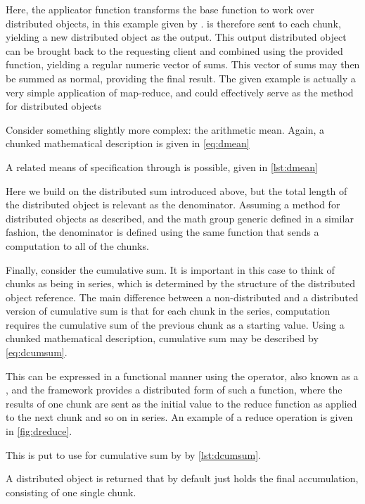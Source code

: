 Here, the  applicator function transforms the base  function to work over distributed objects, in this example given by .
 is therefore sent to each chunk, yielding a new distributed object as the output.
This output distributed object can be brought back to the requesting client and combined using the provided  function, yielding a regular \R{} numeric vector of sums.
This vector of sums may then be summed as normal, providing the final result.
The given example is actually a very simple application of map-reduce, and could effectively serve as the  method for distributed objects

Consider something slightly more complex: the arithmetic mean.
Again, a chunked mathematical description is given in \cref{eq:dmean}


A related means of specification through \lso{} is possible, given in \cref{lst:dmean}


Here we build on the distributed sum introduced above, but the total length of the distributed object is relevant as the denominator.
Assuming a  method for distributed objects as described, and the math group generic defined in a similar fashion, the denominator is defined using the same  function that sends a  computation to all of the chunks.

Finally, consider the cumulative sum.
It is important in this case to think of chunks as being in series, which is determined by the structure of the distributed object reference.
The main difference between a non-distributed and a distributed version of cumulative sum is that for each chunk in the series, computation requires the cumulative sum of the previous chunk as a starting value.
Using a chunked mathematical description, cumulative sum may be described by \cref{eq:dcumsum}.


This can be expressed in a functional manner using the  operator, also known as a , and the \lso{} framework provides a distributed form of such a function, where the results of one chunk are sent as the initial value to the reduce function as applied to the next chunk and so on in series.
An example of a reduce operation is given in \cref{fig:dreduce}.


This is put to use for cumulative sum by \lso{} by \cref{lst:dcumsum}.


A distributed object is returned that by default just holds the final accumulation, consisting of one single chunk.
